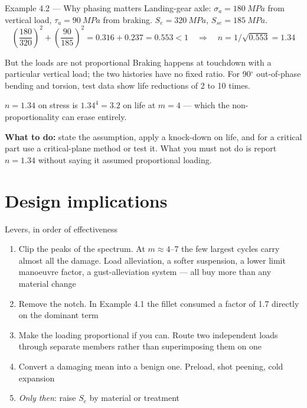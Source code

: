 \documentclass[aspectratio=169,10pt]{beamer}
\begin{document}
\begin{frame}{Example 4.2 --- Why phasing matters}
Landing-gear axle: $\sigma_a=\SI{180}{MPa}$ from vertical load, $\tau_a=\SI{90}{MPa}$ from braking. $S_e=\SI{320}{MPa}$, $S_{se}=\SI{185}{MPa}$.
\[
\left(\frac{180}{320}\right)^{2}+\left(\frac{90}{185}\right)^{2}=0.316+0.237=0.553<1
\quad\Rightarrow\quad n=1/\sqrt{0.553}=1.34
\]
\begin{alertblock}{But the loads are not proportional}
Braking happens at touchdown with a particular vertical load; the two histories have no fixed ratio. For 90$^\circ$ out-of-phase bending and torsion, test data show \alert{life reductions of 2 to 10 times}.
\end{alertblock}
\vspace{2pt}
\footnotesize $n=1.34$ on stress is $1.34^{4}=3.2$ on life at $m=4$ --- which the non-proportionality can erase entirely.

\textbf{What to do:} state the assumption, apply a knock-down on life, and for a critical part use a critical-plane method or test it. \alert{What you must not do} is report $n=1.34$ without saying it assumed proportional loading.
\end{frame}

\section{Design implications}

\begin{frame}{Levers, in order of effectiveness}
\begin{enumerate}
  \item \alert{Clip the peaks of the spectrum.} At $m\approx4$--7 the few largest cycles carry almost all the damage. Load alleviation, a softer suspension, a lower limit manoeuvre factor, a gust-alleviation system --- all buy more than any material change
  \item \alert{Remove the notch.} In Example 4.1 the fillet consumed a factor of 1.7 directly on the dominant term
  \item \alert{Make the loading proportional if you can.} Route two independent loads through separate members rather than superimposing them on one
  \item \alert{Convert a damaging mean into a benign one.} Preload, shot peening, cold expansion
  \item \emph{Only then}: raise $S_e$ by material or treatment
\end{enumerate}
\end{frame}
\end{document}

